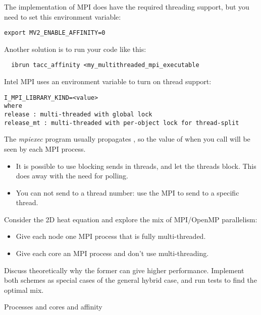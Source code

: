 \begin{tacc}
  The  implementation of MPI
  does have the required threading support, but you need to set this environment variable:  
\begin{verbatim}
export MV2_ENABLE_AFFINITY=0
\end{verbatim}
  Another solution is to run your code like this:
\begin{verbatim}
  ibrun tacc_affinity <my_multithreaded_mpi_executable
\end{verbatim}
  Intel MPI uses an environment variable to turn on thread support:
\begin{verbatim}
I_MPI_LIBRARY_KIND=<value>
where
release : multi-threaded with global lock
release_mt : multi-threaded with per-object lock for thread-split  
\end{verbatim}
\end{tacc}

The \emph{mpiexec}
program usually propagates ,
so the value of  when you call 
will be seen by each MPI process.

\begin{itemize}
\item It is possible to use blocking sends in threads, and let the
  threads block. This does away with the need for polling.
\item You can not send to a thread number: use the MPI
   to send to a specific thread.
\end{itemize}

\begin{exercise}
Consider the 2D heat equation and explore the mix of MPI/OpenMP
parallelism:
\begin{itemize}
\item Give each node one MPI process that is fully multi-threaded.
\item Give each core an MPI process and don't use multi-threading.
\end{itemize}
Discuss theoretically why the former can give higher performance.
Implement both schemes as special cases of the general hybrid case,
and run tests to find the optimal mix.
\end{exercise}


 {Processes and cores and affinity}


